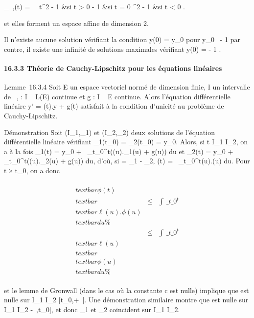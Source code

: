 \documentclass[]{article}
\begin{document}
 \phi\_\lambda~,\mu(t) = \left \
\cases \lambda~t^2 - 1 
&si t \textgreater{} 0 \cr - 1  &si t = 0 \cr \mut^2 - 1
\over 2 &si t \textless{} 0  \right .

et elles forment un espace affine de dimension 2.

Il n'existe aucune solution vérifiant la condition y(0) = y\_0
pour y\_0\neq~ - 1  par contre, il existe une infinité de solutions maximales vérifiant
y(0) = - 1 \over 2 .

\paragraph{16.3.3 Théorie de Cauchy-Lipschitz pour les équations
linéaires}

Lemme~16.3.4 Soit E un espace vectoriel normé de dimension finie, I un
intervalle de \mathbb{R}~, \ell : I \rightarrow~ L(E) continue et g : I \rightarrow~ E continue. Alors
l'équation différentielle linéaire y' = \ell(t).y + g(t) satisfait à la
condition d'unicité au problème de Cauchy-Lipschitz.

Démonstration Soit (I\_1,\phi\_1) et
(I\_2,\phi\_2) deux solutions de l'équation différentielle
linéaire vérifiant \phi\_1(t\_0) =
\phi\_2(t\_0) = y\_0. Alors, si t \in I\_1 \bigcap
I\_2, on a à la fois \phi\_1(t) = y\_0
+\int ~
\_t\_0^t(\ell(u).\phi\_1(u) + g(u)) du et
\phi\_2(t) = y\_0 +\int ~
\_t\_0^t(\ell(u).\phi\_2(u) + g(u)) du, d'où, si
\phi = \phi\_1 - \phi\_2, \phi(t) =\int ~
\_t\_0^t\ell(u).\phi(u) du. Pour t ≥ t\_0, on a
donc

\begin{align*}
\\textbar{}\phi(t)\\textbar{}& \leq&
\int ~
\_t\_0^t\\textbar{}\ell(u).\phi(u)\\textbar{}
du\%& \\ & \leq&
\int ~
\_t\_0^t\\textbar{}\ell(u)\\textbar{}\\textbar{}\phi(u)\\textbar{}
du \%& \\
\end{align*}

et le lemme de Gronwall (dans le cas où la constante c est nulle)
implique que \phi est nulle sur I\_1 \bigcap I\_2 \bigcap
{[}t\_0,+\infty~{[}. Une démonstration similaire montre que \phi est
nulle sur I\_1 \bigcap I\_2\bigcap{]} -\infty~,t\_0{]}, et donc
\phi\_1 et \phi\_2 coïncident sur I\_1 \bigcap I\_2.
\end{document}
